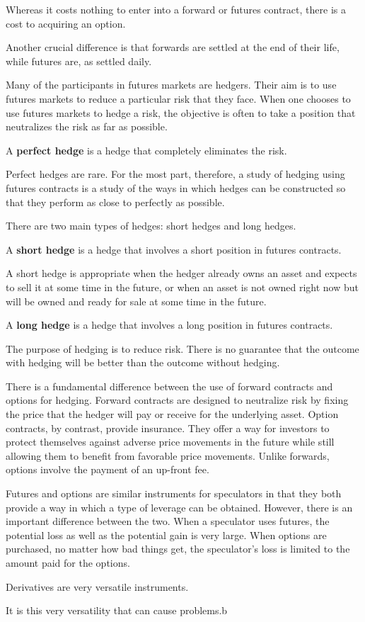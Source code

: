 Whereas it costs nothing to enter into a forward or futures contract, there is a cost to acquiring an option.

Another crucial difference is that forwards are settled at the end of their life, while futures are, as settled daily.

Many of the participants in futures markets are hedgers. Their aim is to use futures markets to reduce a particular
risk that they face. When one chooses to use futures markets to hedge a risk, the objective is often to take a
position that neutralizes the risk as far as possible.

A \textbf{perfect hedge} is a hedge that completely eliminates the risk.
\ed

Perfect hedges are rare. For the most part, therefore, a study of hedging using futures contracts is a study of the
ways in which hedges can be constructed so that they perform as close to perfectly as possible.

There are two main types of hedges: short hedges and long hedges.

A \textbf{short hedge} is a hedge that involves a short position in futures contracts.
\ed

A short hedge is appropriate when the hedger already owns an asset and expects to sell it at some time in the
future, or when an asset is not owned right now but will be owned and ready for sale at some time in the future.

A \textbf{long hedge} is a hedge that involves a long position in futures contracts.
\ed

The purpose of hedging is to reduce risk. There is no guarantee that the outcome with hedging will be better than the
outcome without hedging.

There is a fundamental difference between the use of forward contracts and options for hedging. Forward contracts
are designed to neutralize risk by fixing the price that the hedger will pay or receive for the underlying asset.
Option contracts, by contrast, provide insurance. They offer a way for investors to protect themselves against
adverse price movements in the future while still allowing them to benefit from favorable price movements. Unlike
forwards, options involve the payment of an up-front fee.

Futures and options are similar instruments for speculators in that they both provide a way in which a type of
leverage can be obtained. However, there is an important difference between the two. When a speculator uses futures,
the potential loss as well as the potential gain is very large. When options are purchased, no matter how bad things
get, the speculator's loss is limited to the amount paid for the options.

Derivatives are very versatile instruments.

It is this very versatility that can cause problems.b